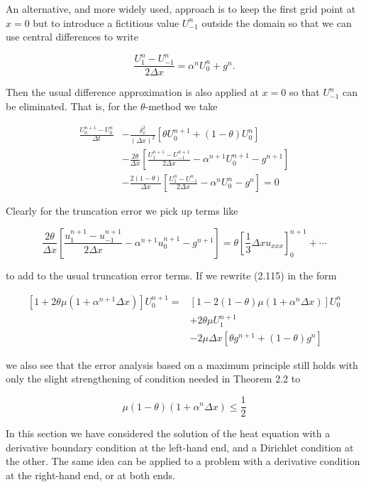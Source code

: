 \documentclass[10pt]{article}
\begin{document}
An alternative, and more widely used, approach is to keep the first grid point at \(x=0\) but to introduce a fictitious value \(U_{-1}^{n}\) outside the domain so that we can use central differences to write

\[
\frac{U_{1}^{n}-U_{-1}^{n}}{2 \Delta x}=\alpha^{n} U_{0}^{n}+g^{n} .
\]

Then the usual difference approximation is also applied at \(x=0\) so that \(U_{-1}^{n}\) can be eliminated. That is, for the \(\theta\)-method we take

\[
\begin{aligned}
\frac{U_{0}^{n+1}-U_{0}^{n}}{\Delta t} & -\frac{\delta_{x}^{2}}{(\Delta x)^{2}}\left[\theta U_{0}^{n+1}+(1-\theta) U_{0}^{n}\right] \\
& -\frac{2 \theta}{\Delta x}\left[\frac{U_{1}^{n+1}-U_{-1}^{n+1}}{2 \Delta x}-\alpha^{n+1} U_{0}^{n+1}-g^{n+1}\right] \\
& -\frac{2(1-\theta)}{\Delta x}\left[\frac{U_{1}^{n}-U_{-1}^{n}}{2 \Delta x}-\alpha^{n} U_{0}^{n}-g^{n}\right]=0
\end{aligned}
\]

Clearly for the truncation error we pick up terms like

\[
\frac{2 \theta}{\Delta x}\left[\frac{u_{1}^{n+1}-u_{-1}^{n+1}}{2 \Delta x}-\alpha^{n+1} u_{0}^{n+1}-g^{n+1}\right]=\theta\left[\frac{1}{3} \Delta x u_{x x x}\right]_{0}^{n+1}+\cdots
\]

to add to the usual truncation error terms. If we rewrite (2.115) in the form

\[
\begin{aligned}
{\left[1+2 \theta \mu\left(1+\alpha^{n+1} \Delta x\right)\right] U_{0}^{n+1}=} & {\left[1-2(1-\theta) \mu\left(1+\alpha^{n} \Delta x\right)\right] U_{0}^{n} } \\
& +2 \theta \mu U_{1}^{n+1} \\
& -2 \mu \Delta x\left[\theta g^{n+1}+(1-\theta) g^{n}\right]
\end{aligned}
\]

we also see that the error analysis based on a maximum principle still holds with only the slight strengthening of condition needed in Theorem 2.2 to

\[
\mu(1-\theta)\left(1+\alpha^{n} \Delta x\right) \leq \frac{1}{2}
\]

In this section we have considered the solution of the heat equation with a derivative boundary condition at the left-hand end, and a Dirichlet condition at the other. The same idea can be applied to a problem with a derivative condition at the right-hand end, or at both ends.
\end{document}
